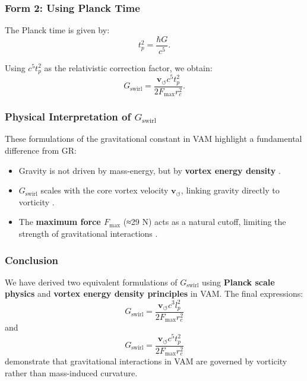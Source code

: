 \subsubsection*{Form 2: Using Planck Time}
The Planck time is given by:
\begin{equation*}
    t_p^2 = \frac{\hbar G}{c^5}.
\end{equation*}

Using \( c^5 t_p^2 \) as the relativistic correction factor, we obtain:
\begin{equation*}
     G_\text{swirl} = \frac{\mathbf{v}_{\scriptscriptstyle\boldsymbol{\circlearrowleft}} c^5 t_p^2}{2 F_{\max} r_c^2}.
\end{equation*}

\subsubsection*{Physical Interpretation of \(  G_\text{swirl} \)}
These formulations of the gravitational constant in VAM highlight a fundamental difference from GR:
\begin{itemize}
    \item Gravity is not driven by mass-energy, but by \textbf{vortex energy density} \cite{barcelo_superfluid}.
    \item \(  G_\text{swirl} \) scales with the core vortex velocity \( \mathbf{v}_{\scriptscriptstyle\boldsymbol{\circlearrowleft}} \), linking gravity directly to vorticity \cite{moffatt_helicity}.
    \item The \textbf{maximum force \( F_{\max} \)} (≈29 N) acts as a natural cutoff, limiting the strength of gravitational interactions \cite{schiller_max_force}.
\end{itemize}

\subsubsection*{Conclusion}
We have derived two equivalent formulations of \(  G_\text{swirl} \) using \textbf{Planck scale physics} and \textbf{vortex energy density principles} in VAM. The final expressions:
\begin{equation*}
     G_\text{swirl} = \frac{\mathbf{v}_{\scriptscriptstyle\boldsymbol{\circlearrowleft}} c^3 l_p^2}{2 F_{\max} r_c^2}
\end{equation*}
and
\begin{equation*}
     G_\text{swirl} = \frac{\mathbf{v}_{\scriptscriptstyle\boldsymbol{\circlearrowleft}} c^5 t_p^2}{2 F_{\max} r_c^2}
\end{equation*}
demonstrate that gravitational interactions in VAM are governed by vorticity rather than mass-induced curvature.